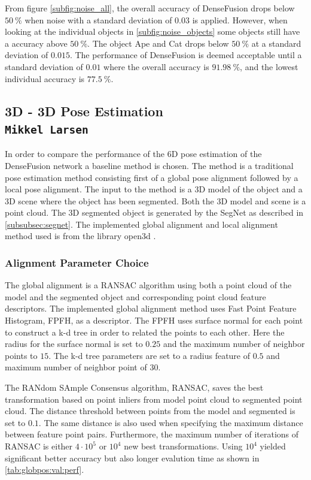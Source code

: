 \documentclass[../main.tex]{subfiles}
\begin{document}
From figure \ref{subfig:noise_all}, the overall accuracy of DenseFusion drops below $50\ \%$ when noise with a standard deviation of $0.03$ is applied. However, when looking at the individual objects in \ref{subfig:noise_objects} some objects still have a accuracy above $50\ \%$. The object Ape and Cat drops below $50\ \%$ at a standard deviation of $0.015$. The performance of DenseFusion is deemed acceptable until a standard deviation of $0.01$ where the overall accuracy is $91.98\ \%$, and the lowest individual accuracy is $77.5\ \%$.

\subsection{3D - 3D Pose Estimation\\ \normalfont\normalsize\texttt{Mikkel Larsen}} \label{subsec:3d-3d}
In order to compare the performance of the 6D pose estimation of the DenseFusion network a baseline method is chosen. The method is a traditional pose estimation method consisting first of a global pose alignment followed by a local pose alignment. The input to the method is a 3D model of the object and a 3D scene where the object has been segmented. Both the 3D model and scene is a point cloud. The 3D segmented object is generated by the SegNet as described in \autoref{subsubsec:segnet}. The implemented global alignment and local alignment method used is from the library open3d \cite{open3d}.

\subsubsection{Alignment Parameter Choice}
The global alignment is a RANSAC algorithm using both a point cloud of the model and the segmented object and corresponding point cloud feature descriptors. The implemented global alignment method uses Fast Point Feature Histogram, FPFH, as a descriptor. The FPFH uses surface normal for each point to construct a k-d tree in order to related the points to each other. Here the radius for the surface normal is set to $0.25$ and the maximum number of neighbor points to $15$. The k-d tree parameters are set to a radius feature of $0.5$ and maximum number of neighbor point of $30$.

The RANdom SAmple Consensus algorithm, RANSAC, saves the best transformation based on point inliers from model point cloud to segmented point cloud. The distance threshold between points from the model and segmented is set to $0.1$. The same distance is also used when specifying the maximum distance between feature point pairs. Furthermore, the maximum number of iterations of RANSAC is either $4\cdot10^5$ or $10^4$ new best transformations. Using $10^4$ yielded significant better accuracy but also longer evalution time as shown in \autoref{tab:globpos:val:perf}. 
\end{document}
